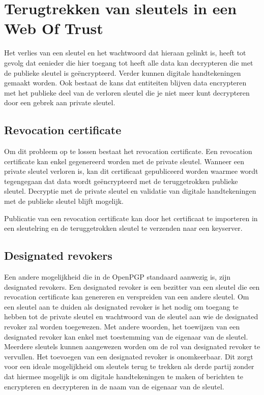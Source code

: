 \section{Terugtrekken van sleutels in een Web Of Trust}
\label{sec:terugtrekken-van-sleutels-in-een-wot}

Het verlies van een sleutel en het wachtwoord dat hieraan gelinkt is, heeft tot
gevolg dat eenieder die hier toegang tot heeft alle data kan decrypteren die
met de publieke sleutel is geëncrypteerd. Verder kunnen digitale handtekeningen
gemaakt worden. Ook bestaat de kans dat entiteiten blijven data encrypteren met
het publieke deel van de verloren sleutel die je niet meer kunt decrypteren
door een gebrek aan private sleutel.

\subsection{Revocation certificate}

Om dit probleem op te lossen bestaat het revocation certificate. Een revocation
certificate kan enkel gegenereerd worden met de private sleutel. Wanneer een
private sleutel verloren is, kan dit certificaat gepubliceerd worden waarmee
wordt tegengegaan dat data wordt geëncrypteerd met de teruggetrokken publieke
sleutel. Decryptie met de private sleutel en validatie van digitale
handtekeningen met de publieke sleutel blijft mogelijk.
\autocite{GNUManualGettingStarted}

Publicatie van een revocation certificate kan door het certificaat te importeren
in een sleutelring en de teruggetrokken sleutel te verzenden naar een keyserver.

\subsection{Designated revokers}
\label{subsec:designated-revokers}

Een andere mogelijkheid die in de \gls{OpenPGP} standaard aanwezig is, zijn designated
revokers. Een designated revoker is een bezitter van een sleutel die een
revocation certificate kan genereren en verspreiden van een andere sleutel.
\autocite{rfc4880} Om een sleutel aan te duiden als designated revoker is het
nodig om toegang te hebben tot de private sleutel en wachtwoord van de sleutel
aan wie de designated revoker zal worden toegewezen. Met andere woorden, het
toewijzen van een designated revoker kan enkel met toestemming van de eigenaar
van de sleutel. Meerdere sleutels kunnen aangewezen worden om de rol van
designated revoker te vervullen. Het toevoegen van een designated revoker is
onomkeerbaar. Dit zorgt voor een ideale mogelijkheid om sleutels terug te
trekken als derde partij zonder dat hiermee mogelijk is om digitale
handtekeningen te maken of berichten te encrypteren en decrypteren in de naam
van de eigenaar van de sleutel.

